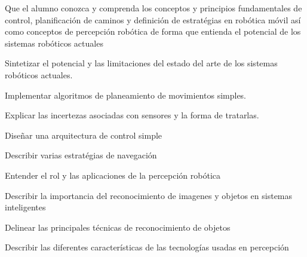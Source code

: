 \begin{syllabus}


\begin{justification}
Que el alumno conozca y comprenda los conceptos y principios fundamentales de control, planificación de caminos y
definición de estratégias en robótica móvil así como conceptos de percepción robótica de forma que entienda el potencial
de los sistemas robóticos actuales
\end{justification}

\begin{goals}
\item Sintetizar el potencial y las limitaciones del estado del arte de los sistemas robóticos actuales.
\item Implementar algoritmos de planeamiento de movimientos simples.
\item Explicar las incertezas asociadas con sensores y la forma de tratarlas.
\item Diseñar una arquitectura de control simple
\item Describir varias estratégias de navegación
\item Entender el rol y las aplicaciones de la percepción robótica
\item Describir la importancia del reconocimiento de imagenes y objetos en sistemas inteligentes
\item Delinear las principales técnicas de reconocimiento de objetos
\item Describir las diferentes características de las tecnologías usadas en percepción
\end{goals}

\begin{outcomes}
    \item {}
    \item {}
    \item {}
    \item {}
\end{outcomes}

\begin{competences}
    \item {} 
    \item {} 
    \item {}
    \item {}
\end{competences}


\end{syllabus}
